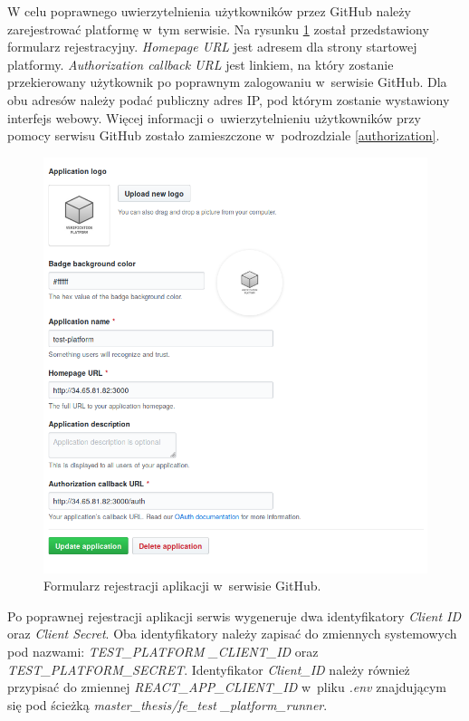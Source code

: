 W celu poprawnego uwierzytelnienia użytkowników przez GitHub należy zarejestrować platformę w~tym serwisie.
Na rysunku \ref{fig:github_app_register} został przedstawiony formularz rejestracyjny.
\textit{Homepage URL} jest adresem dla strony startowej platformy.
\textit{Authorization callback URL} jest linkiem, na który zostanie przekierowany użytkownik po poprawnym zalogowaniu w~serwisie GitHub.
Dla obu adresów należy podać publiczny adres IP, pod którym zostanie wystawiony interfejs webowy.
Więcej informacji o~uwierzytelnieniu użytkowników przy pomocy serwisu GitHub zostało zamieszczone w~podrozdziale \ref{authorization}.

\begin{figure}[h]
    \centering
    \includegraphics[width = 12cm]{chapter05/github_app_register.png}
    \caption{Formularz rejestracji aplikacji w~serwisie GitHub.}
    \label{fig:github_app_register}
\end{figure}

Po poprawnej rejestracji aplikacji serwis wygeneruje dwa identyfikatory \textit{Client ID} oraz \textit{Client Secret}.
Oba identyfikatory należy zapisać do zmiennych systemowych pod nazwami: \textit{TEST\_PLATFORM} \newline \textit{\_CLIENT\_ID} oraz \textit{TEST\_PLATFORM\_SECRET}.
Identyfikator \textit{Client\_ID} należy również przypisać do zmiennej \textit{REACT\_APP\_CLIENT\_ID} w~pliku \textit{.env} znajdującym się pod ścieżką \textit{master\_thesis/fe\_test} \newline \textit{\_platform\_runner}.

